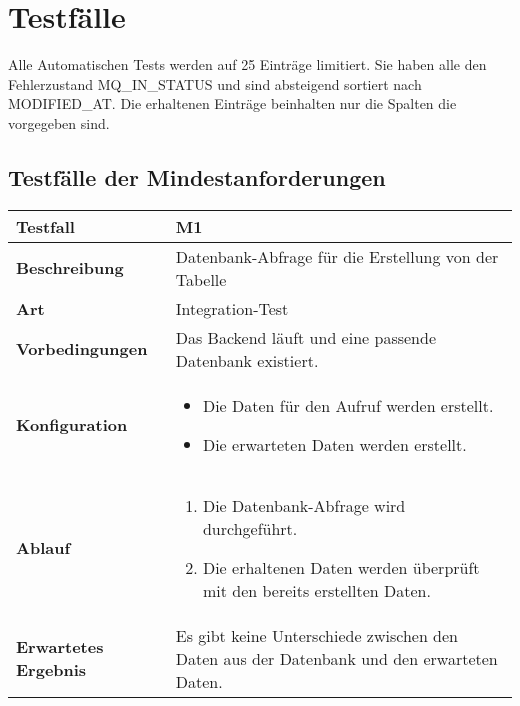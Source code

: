 \section{Testfälle}
Alle Automatischen Tests werden auf 25 Einträge limitiert. Sie haben alle den Fehlerzustand MQ\_IN\_STATUS und sind absteigend sortiert nach MODIFIED\_AT. Die erhaltenen Einträge beinhalten nur die Spalten die vorgegeben sind.

\subsection{Testfälle der Mindestanforderungen}

\begin{longtable}{p{}|p{}}
	\hline
	\textbf{Testfall}               & \textbf{M1} \\
	\hline
	\textbf{Beschreibung}   		& Datenbank-Abfrage für die Erstellung von der Tabelle \\
	\hline
	\textbf{Art}    				& Integration-Test \\
	\hline
	\textbf{Vorbedingungen}    		& Das Backend läuft und eine passende Datenbank existiert. \\
	\hline
	\textbf{Konfiguration}   	 	& 
	\begin{itemize}
		\item Die Daten für den Aufruf werden erstellt.
		\item Die erwarteten Daten werden erstellt.
	\end{itemize} \\
	\hline
	\textbf{Ablauf}    				& 
	\begin{enumerate}
		\item Die Datenbank-Abfrage wird durchgeführt.
		\item Die erhaltenen Daten werden überprüft mit den bereits erstellten Daten.
	\end{enumerate} \\
	\hline
	\textbf{Erwartetes Ergebnis}    & Es gibt keine Unterschiede zwischen den Daten aus der Datenbank und den erwarteten Daten.  \\
	\hline
\end{longtable}\label{tab:testfall-M1}

